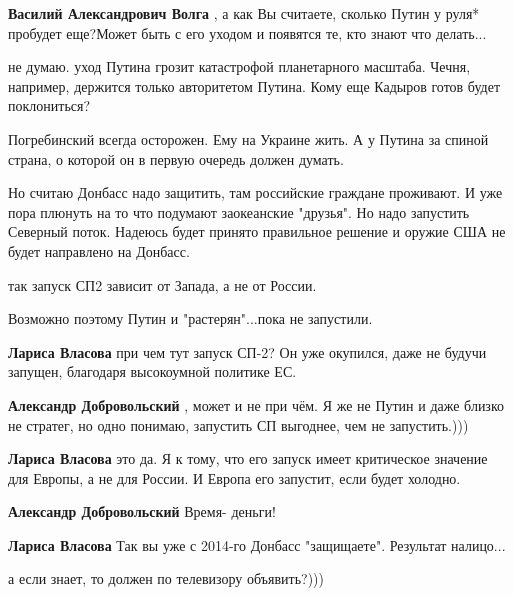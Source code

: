 \begin{itemize}
\begin{itemize}
\end{itemize} %

\textbf{Василий Александрович Волга} , а как Вы считаете, сколько Путин у руля* пробудет еще?Может быть с его уходом и появятся те, кто знают что делать...

\begin{itemize} %

не думаю. уход Путина грозит катастрофой планетарного масштаба. Чечня,
например, держится только авторитетом Путина. Кому еще Кадыров готов будет
поклониться?

\end{itemize} %


Погребинский всегда осторожен. Ему на Украине жить. А у Путина за спиной
страна, о которой он в первую очередь должен думать.

Но считаю Донбасс надо защитить, там российские граждане проживают. И уже пора
плюнуть на то что подумают заокеанские "друзья". Но надо запустить Северный
поток. Надеюсь будет принято правильное решение и оружие США не будет
направлено на Донбасс.

\begin{itemize} %
так запуск СП2 зависит от Запада, а не от России.

Возможно поэтому Путин и "растерян"...пока не запустили.

\textbf{Лариса Власова} при чем тут запуск СП-2? Он уже окупился, даже не будучи запущен, благодаря высокоумной политике ЕС.

\textbf{Александр Добровольский} , может и не при чём. Я же не Путин и даже близко не стратег, но одно понимаю, запустить СП выгоднее, чем не запустить.)))

\textbf{Лариса Власова} это да. Я к тому, что его запуск имеет критическое значение для Европы, а не для России. И Европа его запустит, если будет холодно.

\textbf{Александр Добровольский} Время- деньги!

\textbf{Лариса Власова} Так вы уже с 2014-го Донбасс "защищаете". Результат налицо...
\end{itemize} %

а если знает, то должен по телевизору объявить?)))


\end{itemize}
